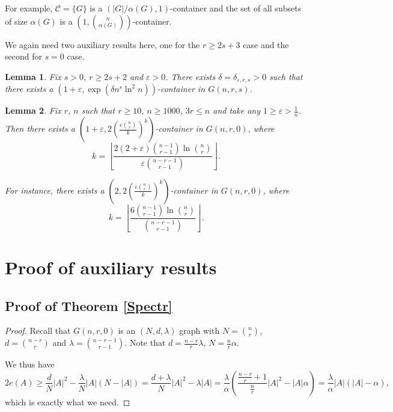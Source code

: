 \documentclass[10pt,a4paper]{article}
\newtheorem{lemma}{Lemma}[section]
\theoremstyle{remark}
\theoremstyle{definition}
\newcommand{\skob}[1]{\left(#1\right)}
\newcommand{\flr}[1]{\left\lfloor#1\right\rfloor}
\begin{document}
For example, $\mathcal{C} = \{G\}$ is a $(|G| / \alpha(G), 1)$-container and the set of all subsets of size $\alpha(G)$ is a $\skob{1, \binom{n}{\alpha(G)}}$-container.

We again need two auxiliary results here, one for the $r \geq 2s+3$ case and the second for $s = 0$ case. 

\begin{lemma}
    \label{mainL}
    Fix $s > 0$, $r \geq 2s+2$ and $\varepsilon > 0$. There exists $\delta = \delta_{\varepsilon, r, s} > 0$ such that there exists a $(1 + \varepsilon, \exp\skob{\delta n^s \ln^2 n})$-container in $G(n,r,s)$.
\end{lemma}

\begin{lemma}
    	\label{mainLKG}
    	Fix $r$, $n$ such that $r \geq 10$, $n \geq 1000$, $3r \leq n$ and take any $1 \geq \varepsilon > \frac{1}{n}$. Then there exists a $\skob{1 + \varepsilon,2\skob{\frac{e\binom{n}{r}}{k}}^k}$-container in $G(n,r,0)$, where 
	$$
		k =  \flr{\frac{2(2+\varepsilon)\binom{n-1}{r-1}\ln \binom{n}{r}}{\varepsilon\binom{n-r-1}{r-1}}}.
	$$

    For instance, there exists a $\skob{2, 2\skob{\frac{e\binom{n}{r}}{k}}^k}$-container in $G(n,r,0)$, where 
	$$
		k =  \flr{\frac{6\binom{n-1}{r-1}\ln \binom{n}{r}}{\binom{n-r-1}{r-1}}}.
	$$
\end{lemma}

\section{Proof of auxiliary results}

\subsection{Proof of Theorem \ref{Spectr}}

\begin{proof}
	Recall that $G(n,r,0)$ is an $(N, d, \lambda)$ graph with $N = \binom{n}{r}$, $d = \binom{n-r}{r}$ and $\lambda = \binom{n-r-1}{r-1}$. Note that $d = \frac{n-r}{r}\lambda$, $N = \frac{n}{r}\alpha$.

	We thus have
	$$
		2e(A) \geq \frac{d}{N}|A|^2 - \frac{\lambda}{N}|A|(N-|A|) = \frac{d+\lambda}{N}|A|^2 - \lambda|A| = \frac{\lambda}{\alpha}\skob{\frac{\frac{n-r}{r}+1}{\frac{n}{r}}|A|^2-|A|\alpha} = \frac{\lambda}{\alpha}|A|(|A| - \alpha),
	$$
	which is exactly what we need.
\end{proof}
\end{document}
